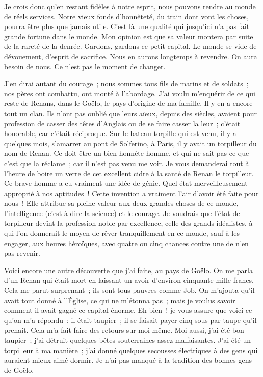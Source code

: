 \documentclass[french,twoside]{book} %
\newcommand\orgName[1]{#1}
\newcommand\persName[1]{#1}
\newcommand\placeName[1]{#1}
\begin{document}
Je crois donc qu’en restant fidèles à notre esprit, nous pouvons rendre au monde de réels services. Notre vieux fonds d’honnêteté, du train dont vont les choses, pourra être plus que jamais utile. C’est là une qualité qui jusqu’ici n’a pas fait grande fortune dans le monde. Mon opinion est que sa valeur montera par suite de la rareté de la denrée. Gardons, gardons ce petit capital. Le monde se vide de dévouement, d’esprit de sacrifice. Nous en aurons longtemps à revendre. On aura besoin de nous. Ce n’est pas le moment de changer.\par
J’en dirai autant du courage ; nous sommes tous fils de marins et de soldats ; nos pères ont combattu, ont monté à l’abordage. J’ai voulu m’enquérir de ce qui reste de {\orgName Renans}, dans le {\placeName Goëlo}, le pays d’origine de ma famille. Il y en a encore tout un clan. Ils n’ont pas oublié que leurs aïeux, depuis des siècles, avaient pour profession de casser des têtes d’Anglais ou de se faire casser la leur ; c’était honorable, car c’était réciproque. Sur le bateau-torpille qui est venu, il y a quelques mois, s’amarrer au {\placeName pont de Solferino}, à {\placeName Paris}, il y avait un torpilleur du nom de Renan. Ce doit être un bien honnête homme, et qui ne sait pas ce que c’est que la réclame ; car il n’est pas venu me voir. Je vous demanderai tout à l’heure de boire un verre de cet excellent cidre à la santé de {\persName Renan le torpilleur}. Ce brave homme a eu vraiment une idée de génie. Quel état merveilleusement approprié à nos aptitudes ! Cette invention a vraiment l’air d’avoir été faite pour nous ! Elle attribue sa pleine valeur aux deux grandes choses de ce monde, l’intelligence (c’est-à-dire la science) et le courage. Je voudrais que l’état de torpilleur devînt la profession noble par excellence, celle des grands idéalistes, à qui l’on donnerait le moyen de rêver tranquillement en ce monde, sauf à les engager, aux heures héroïques, avec quatre ou cinq chances contre une de n’en pas revenir.\par
Voici encore une autre découverte que j’ai faite, au pays de Goëlo. On me parla d’un Renan qui était mort en laissant un avoir d’environ cinquante mille francs. Cela me parut surprenant ; ils sont tous pauvres comme {\persName Job}. On m’ajouta qu’il avait tout donné à l’Église, ce qui ne m’étonna pas ; mais je voulus savoir comment il avait gagné ce capital énorme. Eh bien ! je vous assure que voici ce qu’on m’a répondu : il était taupier ; il se faisait payer cinq sous par taupe qu’il prenait. Cela m’a fait faire des retours sur moi-même. Moi aussi, j’ai été bon taupier ; j’ai détruit quelques bêtes souterraines assez malfaisantes. J’ai été un torpilleur à ma manière ; j’ai donné quelques secousses électriques à des gens qui auraient mieux aimé dormir. Je n’ai pas manqué à la tradition des bonnes gens de {\placeName Goëlo}.\par
\end{document}
